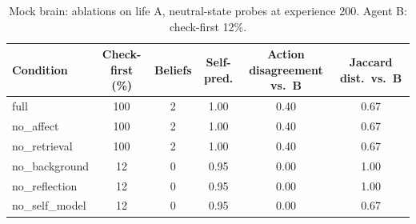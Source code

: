 \begin{table}[h]\centering\small
\caption{Mock brain: ablations on life A, neutral-state probes at experience 200. Agent B: check-first 12\%.}
\label{tab:mock_abl}
\begin{tabular}{lccccc}\toprule
Condition & Check-first (\%) & Beliefs & Self-pred. & Action disagreement vs.\ B & Jaccard dist.\ vs.\ B\\\midrule
full & 100 & 2 & 1.00 & 0.40 & 0.67\\
no\_affect & 100 & 2 & 1.00 & 0.40 & 0.67\\
no\_retrieval & 100 & 2 & 1.00 & 0.40 & 0.67\\
no\_background & 12 & 0 & 0.95 & 0.00 & 1.00\\
no\_reflection & 12 & 0 & 0.95 & 0.00 & 1.00\\
no\_self\_model & 12 & 0 & 0.95 & 0.00 & 0.67\\
\bottomrule\end{tabular}\end{table}
